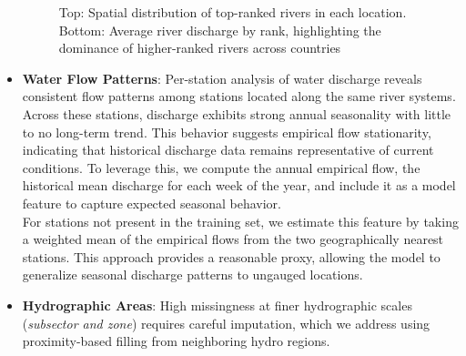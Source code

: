 \documentclass[ruler]{CUP-JNL-EDS}%
\begin{document}
\begin{itemize}
\begin{figure}[h]
        \caption{Top: Spatial distribution of top-ranked rivers in each location. Bottom: Average river discharge by rank, highlighting the dominance of higher-ranked rivers across countries}
        \label{fig:river_ranking}
    \end{figure}
    \vspace{3mm}

    \item{\textbf{Water Flow Patterns}}: Per-station analysis of water discharge reveals consistent flow patterns among stations located 
    along the same river systems. Across these stations, discharge exhibits strong annual seasonality with little to no long-term trend. 
    This behavior suggests empirical flow stationarity, indicating that historical discharge data remains representative of current 
    conditions. To leverage this, we compute the annual empirical flow, the historical mean discharge for each week of the year, and 
    include it as a model feature to capture expected seasonal behavior.\\ 
    \vspace{5mm}
    For stations not present in the training set, we estimate this feature by taking a weighted mean of the empirical flows from the 
    two geographically nearest stations. This approach provides a reasonable proxy, allowing the model to generalize seasonal discharge 
    patterns to ungauged locations.\\
    \vspace{3mm}

    \item{\textbf{Hydrographic Areas}}: High missingness at finer hydrographic scales (\textit{subsector and zone}) requires careful 
    imputation, which we address using proximity-based filling from neighboring hydro regions.

\end{itemize}
\end{document}
